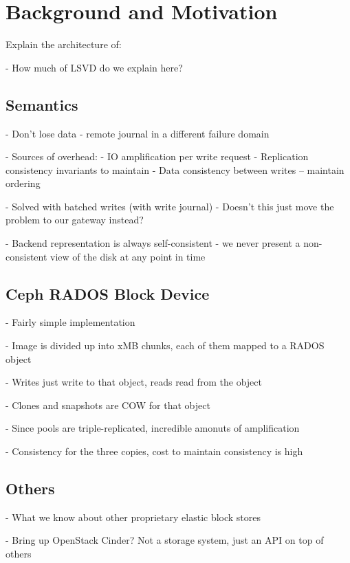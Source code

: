 \section{Background and Motivation}

Explain the architecture of:

- How much of LSVD do we explain here?

\subsection{Semantics}

- Don't lose data - remote journal in a different failure domain

- Sources of overhead: 
    - IO amplification per write request
    - Replication consistency invariants to maintain
    - Data consistency between writes -- maintain ordering

- Solved with batched writes (with write journal)
    - Doesn't this just move the problem to our gateway instead?

- Backend representation is always self-consistent - we never present a non-consistent
  view of the disk at any point in time

\subsection{Ceph RADOS Block Device}

- Fairly simple implementation

- Image is divided up into xMB chunks, each of them mapped to a RADOS object

- Writes just write to that object, reads read from the object

- Clones and snapshots are COW for that object

- Since pools are triple-replicated, incredible amonuts of amplification

- Consistency for the three copies, cost to maintain consistency is high

\subsection{Others}

- What we know about other proprietary elastic block stores

- Bring up OpenStack Cinder? Not a storage system, just an API on top of others
